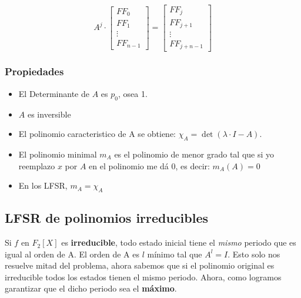 \documentclass[12pt,a4paper]{report}
\begin{document}
$$
A^j \cdot \begin{bmatrix} FF_0 \\ FF_1 \\ \vdots \\ FF_{n-1} \end{bmatrix} = \begin{bmatrix} FF_j \\ FF_{j + 1} \\ \vdots \\ FF_{j + n - 1} \end{bmatrix}
$$

\subsubsection{Propiedades}
\begin{itemize}
\item{El Determinante de $A$ es $p_0$, osea 1.}
\item{$A$ es inversible}
\item{El polinomio caracteristico de A se obtiene: $\chi_A = \det(\lambda \cdot I - A)$.}
\item{El polinomio minimal $m_A$ es el polinomio de menor grado tal que si yo reemplazo $x$ por $A$ en el polinomio me dá 0, es decir: $m_A(A) = 0$}
\item{En los LFSR, $m_A = \chi_A$}
\end{itemize}

\subsection{LFSR de polinomios irreducibles}
Si $f$ en $F_2[X]$ es \textbf{irreducible}, todo estado inicial tiene el \textit{mismo} periodo que es igual al orden de A. El orden de A es $l$ mínimo tal que $A^l = I$. Esto solo nos resuelve mitad del problema, ahora sabemos que si el polinomio original es irreducible todos los estados tienen el mismo periodo. Ahora, como logramos garantizar que el dicho periodo sea el \textbf{máximo}.
\end{document}

